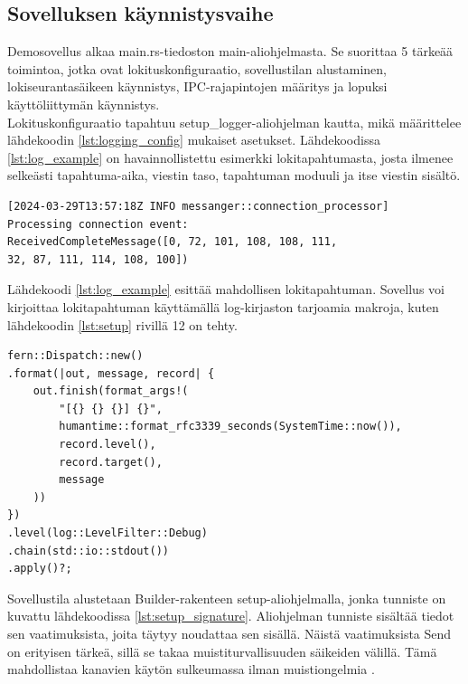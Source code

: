 \documentclass[a4paper,12pt]{article}
\begin{document}
    \subsection{Sovelluksen käynnistysvaihe}

    Demosovellus alkaa main.rs-tiedoston main-aliohjelmasta.
    Se suorittaa 5 tärkeää toimintoa, jotka ovat lokituskonfiguraatio, sovellustilan alustaminen, lokiseurantasäikeen käynnistys, IPC-rajapintojen määritys ja lopuksi käyttöliittymän käynnistys. \\
    
    Lokituskonfiguraatio tapahtuu setup\_logger-aliohjelman kautta, mikä määrittelee lähdekoodin \ref{lst:logging_config} mukaiset asetukset.
    Lähdekoodissa \ref{lst:log_example} on havainnollistettu esimerkki lokitapahtumasta, josta ilmenee selkeästi tapahtuma-aika,
    viestin taso, tapahtuman moduuli ja itse viestin sisältö.

    \begin{lstlisting}[caption={Esimerkki lokitapahtumasta.}, label={lst:log_example}]
[2024-03-29T13:57:18Z INFO messanger::connection_processor]
Processing connection event:
ReceivedCompleteMessage([0, 72, 101, 108, 108, 111,
32, 87, 111, 114, 108, 100])
    \end{lstlisting}
    
    Lähdekoodi \ref{lst:log_example} esittää mahdollisen lokitapahtuman. Sovellus voi kirjoittaa lokitapahtuman käyttämällä log-kirjaston tarjoamia makroja, kuten lähdekoodin \ref{lst:setup} rivillä 12 on tehty.\par

    \begin{lstlisting}[caption={Lokituskonfiguraatio}, label={lst:logging_config}]
fern::Dispatch::new()
.format(|out, message, record| {
    out.finish(format_args!(
        "[{} {} {}] {}",
        humantime::format_rfc3339_seconds(SystemTime::now()),
        record.level(),
        record.target(),
        message
    ))
})
.level(log::LevelFilter::Debug)
.chain(std::io::stdout())
.apply()?;
    \end{lstlisting}


    Sovellustila alustetaan Builder-rakenteen setup-aliohjelmalla, jonka tunniste on kuvattu lähdekoodissa \ref{lst:setup_signature}. Aliohjelman tunniste sisältää tiedot sen vaatimuksista, joita täytyy noudattaa sen sisällä. Näistä vaatimuksista Send on erityisen tärkeä, sillä se takaa muistiturvallisuuden säikeiden välillä. Tämä mahdollistaa kanavien käytön sulkeumassa ilman muistiongelmia \cite[luku 8.2]{rust-book}. \par
\end{document}
